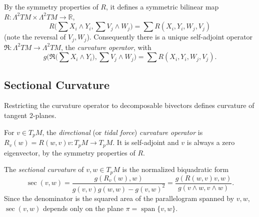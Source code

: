 \begin{definition}
  \label{def:pet-ch3-curvature-operator}
  \leanok
  By the symmetry properties of $R$, it defines a symmetric bilinear map
  $R:\Lambda^2TM\times\Lambda^2TM\to\mathbb R$,
  \[
    R\Big(\sum X_i\wedge Y_i,\sum V_j\wedge W_j\Big)=\sum R(X_i,Y_i,W_j,V_j)
  \]
  (note the reversal of $V_j,W_j$). Consequently there is a unique self-adjoint
  operator $\mathfrak R:\Lambda^2TM\to\Lambda^2TM$, the \emph{curvature operator},
  with
  \[
    g\Big(\mathfrak R\Big(\sum X_i\wedge Y_i\Big),\sum V_j\wedge W_j\Big)
    =\sum R(X_i,Y_i,W_j,V_j).
  \]
\end{definition}

\subsection{Sectional Curvature}

Restricting the curvature operator to decomposable bivectors defines curvature
of tangent $2$-planes.

\begin{definition}
  \label{def:pet-ch3-directional-curvature-operator}
  \leanok
  For $v\in T_pM$, the \emph{directional} (or \emph{tidal force}) \emph{curvature
  operator} is $R_v(w)=R(w,v)v:T_pM\to T_pM$. It is self-adjoint and $v$ is always
  a zero eigenvector, by the symmetry properties of $R$.
\end{definition}

\begin{definition}
  \label{def:pet-ch3-sectional-curvature}
  \leanok
  The \emph{sectional curvature} of $v,w\in T_pM$ is the normalized biquadratic form
  \[
    \sec(v,w)=\frac{g(R_v(w),w)}{g(v,v)g(w,w)-g(v,w)^2}
    =\frac{g(R(w,v)v,w)}{g(v\wedge w,v\wedge w)}.
  \]
  Since the denominator is the squared area of the parallelogram spanned by
  $v,w$, $\sec(v,w)$ depends only on the plane $\pi=\operatorname{span}\{v,w\}$.
\end{definition}

